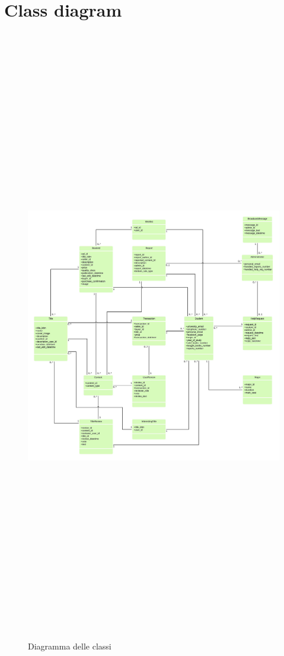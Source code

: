 \documentclass[10pt,a4paper]{article}
\begin{document}
	\section{Class diagram}
	\begin{figure}[H]
		\centering
		\includegraphics[height=27cm, width=17cm, keepaspectratio]{class_diagram}
		\caption{Diagramma delle classi}
	\end{figure}
	
\end{document}

